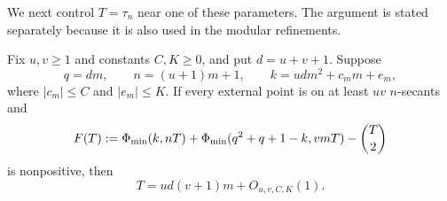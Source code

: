 We next control \(T=\tau_n\) near one of these parameters.  The argument is
stated separately because it is also used in the modular refinements.

\begin{lemma}
\label{lem:secant-number-near-equality}
Fix \(u,v\ge1\) and constants \(C,K\ge0\), and put \(d=u+v+1\).  Suppose
\[
 q=dm,\qquad n=(u+1)m+1,\qquad
 k=udm^2+c_m m+e_m,
\]
where \(|c_m|\le C\) and \(|e_m|\le K\).  If every external point is on at least
\(uv\) \(n\)-secants and
\begin{equation}\label{eq:F-definition}
 F(T):=\Phi_{\min}(k,nT)
 +\Phi_{\min}(q^2+q+1-k,vmT)-\binom T2
\end{equation}
is nonpositive, then
\begin{equation}\label{eq:T-localization}
 T=ud(v+1)m+O_{u,v,C,K}(1).
\end{equation}
\end{lemma}

